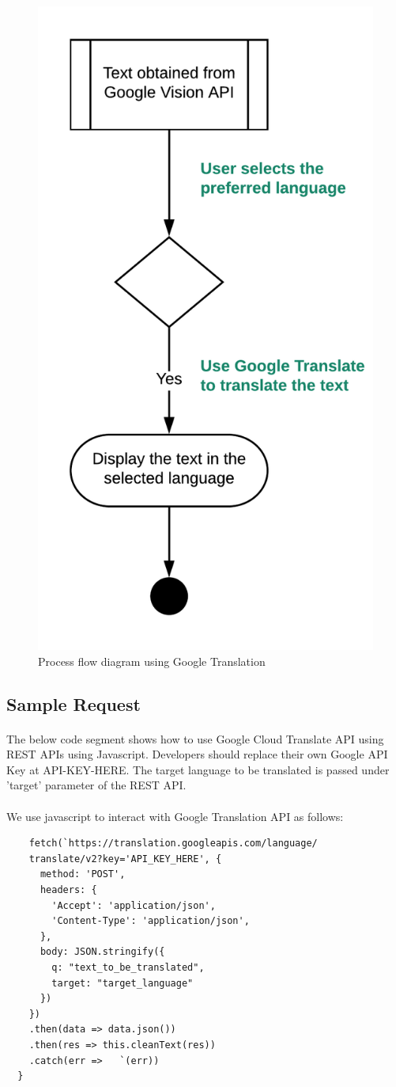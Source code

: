 \documentclass[12pt]{article}
\begin{document}
\begin{figure}[H]
	\centering
	\includegraphics[width=0.5\linewidth]{media/Translate.png}
	\caption{Process flow diagram using Google Translation}
	\label{fig:translate_uml}
\end{figure} 

\subsection{Sample Request}

\paragraph{}The below code segment shows how to use Google Cloud Translate API using REST APIs using Javascript. Developers should replace their own Google API Key at  API-KEY-HERE. The target language to be translated is passed under 'target' parameter of the REST API. 

\paragraph{}We use javascript to interact with Google Translation API as follows:

\begin{lstlisting}
    fetch(`https://translation.googleapis.com/language/
    translate/v2?key='API_KEY_HERE', {
      method: 'POST',
      headers: {
        'Accept': 'application/json',
        'Content-Type': 'application/json',
      },
      body: JSON.stringify({
        q: "text_to_be_translated",
        target: "target_language"
      })
    })
    .then(data => data.json())
    .then(res => this.cleanText(res))
    .catch(err => 	`(err))
  }
\end{lstlisting}
\end{document}
